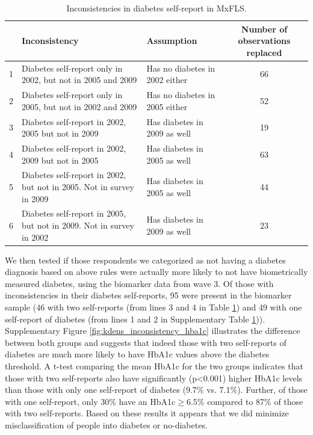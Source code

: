 \documentclass[12pt,english]{article}
\providecommand{\tabularnewline}{\\}
\begin{document}
\begin{table}[!ht]
	\caption{\label{tab:Inconsistencies}Inconsistencies in diabetes self-report in MxFLS.}
	\begin{center}
		\begin{adjustbox}{max width=\linewidth} 
			\begin{tabular}{lllc}
				\hline 
				&Inconsistency  & Assumption  & Number of observations replaced\tabularnewline
				\hline 
				1 &Diabetes self-report only in 2002, but not in 2005 and 2009  & Has no diabetes in 2002 either  & 66\tabularnewline
				2 &Diabetes self-report only in 2005, but not in 2002 and 2009  & Has no diabetes in 2005 either  & 52\tabularnewline
				3 &Diabetes self-report in 2002, 2005 but not in 2009  & Has diabetes in 2009 as well  & 19\tabularnewline
				4 &Diabetes self-report in 2002, 2009 but not in 2005  & Has diabetes in 2005 as well  & 63\tabularnewline
				5 &Diabetes self-report in 2002, but not in 2005. Not in survey in 2009  & Has diabetes in 2005 as well  & 44\tabularnewline
				6 &Diabetes self-report in 2005, but not in 2009. Not in survey in 2002  & Has diabetes in 2009 as well  & 23\tabularnewline
				\hline 
			\end{tabular}
		\end{adjustbox}
	\end{center}
\end{table}

We then tested if those respondents we categorized as not having a diabetes diagnosis based on above rules were actually more likely to not have biometrically measured diabetes, using the biomarker data from wave 3. Of those with inconsistencies in their diabetes self-reports, 95 were present in the biomarker sample (46 with two self-reports (from lines 3 and 4 in Table \ref{tab:Inconsistencies}) and 49 with one self-report of diabetes (from lines 1 and 2 in Supplementary Table \ref{tab:Inconsistencies})). Supplementary Figure \ref{fig:kdens_inconsistency_hba1c} illustrates the difference between both groups and suggests that indeed those with two self-reports of diabetes are much more likely to have \ac{HbA1c} values above the diabetes threshold. A t-test comparing the mean \ac{HbA1c} for the two groups indicates that those with two self-reports also have significantly (p<0.001) higher \ac{HbA1c} levels than those with only one self-report of diabetes (9.7\% vs. 7.1\%). Further, of those with one self-report,  only 30\% have an \ac{HbA1c}$\geq6.5$\% compared to 87\% of those with two self-reports. Based on these results it appears that we did minimize misclassification of people into diabetes or no-diabetes. 
\end{document}
